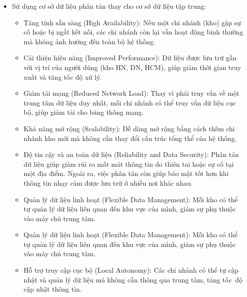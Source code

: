 \documentclass[a4paper,12pt]{report}
\begin{document}
\begin{itemize}
\begin{itemize}
        \item Giao diện với các nút, danh sách lựa chọn, ô nhập liệu được xây dựng mang tính tối giản và hạn chế các quá trình phức tạp, giúp người dùng có thể nắm bắt được cách vận hành ứng dụng trong thời gian ngắn nhất.
        \item Giao diện được phân chia theo màu sắc dựa trên chức vụ của người dùng trong hệ thống, giúp người dùng dễ dàng phân biệt và tránh nhầm lẫn giữa các giao diện trong quá trình vận hành ứng dụng.
    \end{itemize} 
    \item Sử dụng cơ sở dữ liệu phân tán thay cho cơ sở dữ liệu tập trung:
    \begin{itemize}
        \item Tăng tính sẵn sàng (High Availability): Nếu một chi nhánh (kho) gặp sự cố hoặc bị ngắt kết nối, các chi nhánh còn lại vẫn hoạt động bình thường mà không ảnh hưởng đến toàn bộ hệ thống. 
        \item Cải thiện hiệu năng (Improved Performance): Dữ liệu được lưu trữ gần với vị trí của người dùng (kho HN, DN, HCM), giúp giảm thời gian truy xuất và tăng tốc độ xử lý. 
        \item Giảm tải mạng (Reduced Network Load): Thay vì phải truy vấn về một trung tâm dữ liệu duy nhất, mỗi chi nhánh có thể truy vấn dữ liệu cục bộ, giúp giảm tải cho băng thông mạng. 
        \item Khả năng mở rộng (Scalability): Dễ dàng mở rộng bằng cách thêm chi nhánh kho mới mà không cần thay đổi cấu trúc tổng thể của hệ thống. 
        \item Độ tin cậy và an toàn dữ liệu (Reliability and Data Security): Phân tán dữ liệu giúp giảm rủi ro mất mát thông tin do thiên tai hoặc sự cố tại một địa điểm. Ngoài ra, việc phân tán còn giúp bảo mật tốt hơn khi thông tin nhạy cảm được lưu trữ ở nhiều nơi khác nhau. 
        \item Quản lý dữ liệu linh hoạt (Flexible Data Management): Mỗi kho có thể tự quản lý dữ liệu liên quan đến khu vực của mình, giảm sự phụ thuộc vào máy chủ trung tâm. 
        \item Quản lý dữ liệu linh hoạt (Flexible Data Management): Mỗi kho có thể tự quản lý dữ liệu liên quan đến khu vực của mình, giảm sự phụ thuộc vào máy chủ trung tâm. 
        \item Hỗ trợ truy cập cục bộ (Local Autonomy): Các chi nhánh có thể tự cập nhật và quản lý dữ liệu mà không cần thông qua trung tâm, tăng tốc~độ cập nhật thông tin.
    \end{itemize}
\end{itemize}
\end{document}
